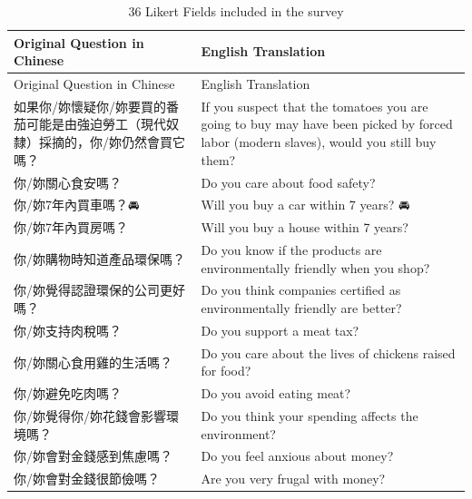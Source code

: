 \documentclass[
  12pt,
  letterpaper,
  DIV=11,
  numbers=noendperiod]{scrartcl}
\begin{document}
\begin{longtable}[]{@{}
  >{\raggedright\arraybackslash}p{}
  >{\raggedright\arraybackslash}p{}@{}}
\caption{36 Likert Fields included in the survey}\tabularnewline
\toprule\noalign{}
\begin{minipage}[b]{\linewidth}\raggedright
Original Question in Chinese
\end{minipage} & \begin{minipage}[b]{\linewidth}\raggedright
English Translation
\end{minipage} \\
\midrule\noalign{}
\endfirsthead
\toprule\noalign{}
\begin{minipage}[b]{\linewidth}\raggedright
Original Question in Chinese
\end{minipage} & \begin{minipage}[b]{\linewidth}\raggedright
English Translation
\end{minipage} \\
\midrule\noalign{}
\endhead
\bottomrule\noalign{}
\endlastfoot
如果你/妳懷疑你/妳要買的番茄可能是由強迫勞工（現代奴隸）採摘的，你/妳仍然會買它嗎？
& If you suspect that the tomatoes you are going to buy may have been
picked by forced labor (modern slaves), would you still buy them? \\
你/妳關心食安嗎？ & Do you care about food safety? \\
你/妳7年內買車嗎？🚘 & Will you buy a car within 7 years? 🚘 \\
你/妳7年內買房嗎？🏡 & Will you buy a house within 7 years? 🏡 \\
你/妳購物時知道產品環保嗎？ & Do you know if the products are
environmentally friendly when you shop? \\
你/妳覺得認證環保的公司更好嗎？ & Do you think companies certified as
environmentally friendly are better? \\
你/妳支持肉稅嗎？ & Do you support a meat tax? \\
你/妳關心食用雞的生活嗎？ & Do you care about the lives of chickens
raised for food? \\
你/妳避免吃肉嗎？ & Do you avoid eating meat? \\
你/妳覺得你/妳花錢會影響環境嗎？ & Do you think your spending affects
the environment? \\
你/妳會對金錢感到焦慮嗎？ & Do you feel anxious about money? \\
你/妳會對金錢很節儉嗎？ & Are you very frugal with money? \\

\end{longtable}
\end{document}

